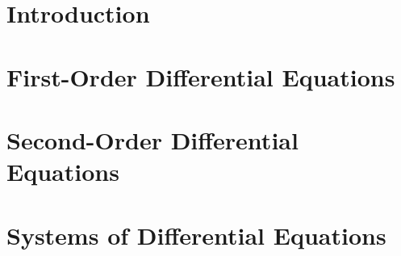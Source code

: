 \documentclass[10pt,a4paper,oneside]{book}
\begin{document}
\tableofcontents

\chapter{Introduction}


\chapter{First-Order Differential Equations}


\chapter{Second-Order Differential Equations}


\chapter{Systems of Differential Equations}

\end{document}
